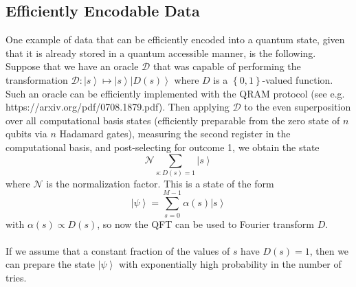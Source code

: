 \documentclass[]{article}
\begin{document}
\subsection*{Efficiently Encodable Data}
One example of data that can be efficiently encoded into a quantum state, given that it is already stored in a quantum accessible manner, is the following. Suppose that we have an oracle $\mathcal{D}$ that was capable of performing the transformation $\mathcal{D}:\left\vert s\right\rangle\mapsto\left\vert s\right\rangle\left\vert D(s)\right\rangle$ where $D$ is a $\left\lbrace 0,1\right\rbrace$-valued function. Such an oracle can be efficiently implemented with the QRAM protocol (see e.g. https://arxiv.org/pdf/0708.1879.pdf). Then applying $\mathcal{D}$ to the even superposition over all computational basis states (efficiently preparable from the zero state of $n$ qubits via $n$ Hadamard gates), measuring the second register in the computational basis, and post-selecting for outcome 1, we obtain the state
\begin{equation}
\mathcal{N}\sum_{s:D(s)=1}\left\vert s\right\rangle
\end{equation}
where $\mathcal{N}$ is the normalization factor. This is a state of the form
\begin{equation}
\left\vert\psi\right\rangle=\sum_{s=0}^{M-1}\alpha(s)\left\vert s\right\rangle
\end{equation}
with $\alpha(s)\propto D(s)$, so now the QFT can be used to Fourier transform $D$.\\
\\
If we assume that a constant fraction of the values of $s$ have $D(s)=1$, then we can prepare the state $\left\vert\psi\right\rangle$ with exponentially high probability in the number of tries.
\end{document}
